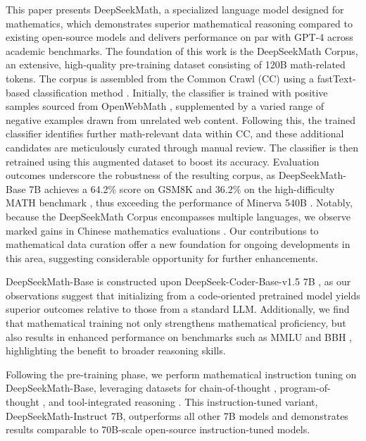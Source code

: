 This paper presents DeepSeekMath, a specialized language model designed for mathematics, which demonstrates superior mathematical reasoning compared to existing open-source models and delivers performance on par with GPT-4 across academic benchmarks. The foundation of this work is the DeepSeekMath Corpus, an extensive, high-quality pre-training dataset consisting of 120B math-related tokens. The corpus is assembled from the Common Crawl (CC) using a fastText-based classification method \citep{joulin2016fasttext}. Initially, the classifier is trained with positive samples sourced from OpenWebMath \citep{openwebmath}, supplemented by a varied range of negative examples drawn from unrelated web content. Following this, the trained classifier identifies further math-relevant data within CC, and these additional candidates are meticulously curated through manual review. The classifier is then retrained using this augmented dataset to boost its accuracy. Evaluation outcomes underscore the robustness of the resulting corpus, as DeepSeekMath-Base 7B achieves a 64.2\% score on GSM8K \citep{gsm8k} and 36.2\% on the high-difficulty MATH benchmark \citep{MATH}, thus exceeding the performance of Minerva 540B \citep{minerva}. Notably, because the DeepSeekMath Corpus encompasses multiple languages, we observe marked gains in Chinese mathematics evaluations \citep{wei2023cmath,agieval}. Our contributions to mathematical data curation offer a new foundation for ongoing developments in this area, suggesting considerable opportunity for further enhancements.

DeepSeekMath-Base is constructed upon DeepSeek-Coder-Base-v1.5 7B \citep{deepseek-coder}, as our observations suggest that initializing from a code-oriented pretrained model yields superior outcomes relative to those from a standard LLM. Additionally, we find that mathematical training not only strengthens mathematical proficiency, but also results in enhanced performance on benchmarks such as MMLU \citep{mmlu} and BBH \citep{bbh}, highlighting the benefit to broader reasoning skills.

Following the pre-training phase, we perform mathematical instruction tuning on DeepSeekMath-Base, leveraging datasets for chain-of-thought \citep{cot}, program-of-thought \citep{pot,pal}, and tool-integrated reasoning \citep{tora}. This instruction-tuned variant, DeepSeekMath-Instruct 7B, outperforms all other 7B models and demonstrates results comparable to 70B-scale open-source instruction-tuned models.

